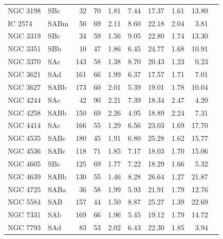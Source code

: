 \documentclass[usenatbib,useAMS]{mnras}
\begin{document}
\begin{table}
\begin{tabular}{llrlllllrl}
NGC 3198 & SBc     &   32  &  70  &  1.81  &  7.44  &  17.37 & 1.61 & 13.80 \\
IC 2574  & SABm    &   50  &  69  &  2.11  &  8.60  &  22.18 & 2.04 &  3.81 \\  
NGC 3319 & SBc     &   34  &  59  &  1.56  &  9.05  &  22.80 & 1.74 & 13.30 \\  
NGC 3351 & SBb     &   10  &  47  &  1.86  &  6.45  &  24.77 & 1.68 & 10.91 \\  
NGC 3370 & SAc     &  143  &  58  &  1.38  &  8.70  &  20.43 & 1.23 &  0.23 \\  
NGC 3621 & SAd     &  161  &  66  &  1.99  &  6.37  &  17.57 & 1.71 &  7.01 \\  
NGC 3627 & SABb    &  173  &  60  &  2.01  &  5.39  &  19.01 & 1.78 & 10.04 \\  
NGC 4244 & SAc     &   42  &  90  &  2.21  &  7.39  &  18.34 & 2.47 &  4.20 \\  
NGC 4258 & SABb    &  150  &  69  &  2.26  &  4.95  &  18.89 & 2.24 &  7.31 \\  
NGC 4414 & SAc     &  166  &  55  &  1.29  &  6.56  &  23.03 & 1.69 & 17.70 \\  
NGC 4535 & SABc    &  180  &  45  &  1.91  &  6.80  &  25.28 & 1.62 & 15.77 \\  
NGC 4536 & SABc    &  118  &  71  &  1.85  &  7.17  &  18.03 & 1.70 & 15.06 \\  
NGC 4605 & SBc     &  125  &  69  &  1.77  &  7.22  &  18.29 & 1.66 &  5.32 \\  
NGC 4639 & SABb    &  130  &  55  &  1.46  &  8.28  &  26.64 & 1.27 & 21.87\\   
NGC 4725 & SABa    &   36  &  58  &  1.99  &  5.93  &  21.91 & 1.79 & 12.76 \\  
NGC 5584 & SAB     &  157  &  44  &  1.50  &  8.87  &  25.27 & 1.39 & 22.69 \\  
NGC 7331 & SAb     &  169  &  66  &  1.96  &  5.45  &  19.12 & 1.79 & 14.72 \\  
NGC 7793 & SAd     &   83  &  53  &  2.02  &  6.43  &  22.30 & 1.85 &  3.94 \\ 
\hline


\end{tabular}
\end{table}
\end{document}
